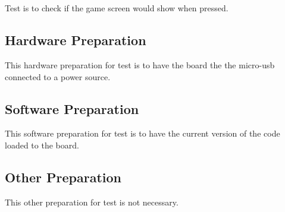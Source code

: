 
\section{\StsTestID}
\label{loc:Prep\StsTestID}


Test \StsTestID{} is to check if the game screen would show when pressed.

\subsection{Hardware Preparation}
\label{loc:HardwarePrep\StsTestID}


This hardware preparation for test \StsTestID{} is to have the board the the micro-usb connected to a power source.

\subsection{Software Preparation}
\label{loc:SoftwarePrep\StsTestID}


This software preparation for test \StsTestID{} is to have the current version of the code loaded to the board.

\subsection{Other Preparation}
\label{loc:OtherPrep\StsTestID}


This other preparation for test \StsTestID{} is not necessary.
